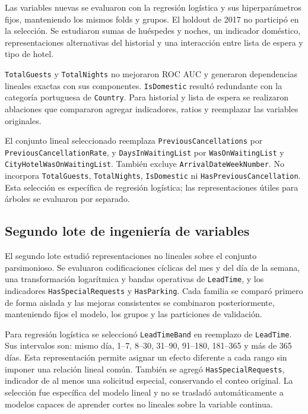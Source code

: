 Las variables nuevas se evaluaron con la regresión logística y sus
hiperparámetros fijos, manteniendo los mismos folds y grupos. El holdout de
2017 no participó en la selección. Se estudiaron sumas de huéspedes y noches,
un indicador doméstico, representaciones alternativas del historial y una
interacción entre lista de espera y tipo de hotel.

\texttt{TotalGuests} y \texttt{TotalNights} no mejoraron ROC AUC y generaron
dependencias lineales exactas con sus componentes. \texttt{IsDomestic} resultó
redundante con la categoría portuguesa de \texttt{Country}. Para historial y
lista de espera se realizaron ablaciones que compararon agregar indicadores,
ratios y reemplazar las variables originales.

El conjunto lineal seleccionado reemplaza \texttt{PreviousCancellations} por
\texttt{PreviousCancellationRate}, y \texttt{DaysInWaitingList} por
\texttt{WasOnWaitingList} y \texttt{CityHotelWasOnWaitingList}. También
excluye \texttt{ArrivalDateWeekNumber}. No incorpora \texttt{TotalGuests},
\texttt{TotalNights}, \texttt{IsDomestic} ni
\texttt{HasPreviousCancellation}. Esta selección es específica de regresión
logística; las representaciones útiles para árboles se evaluaron por separado.

\subsection{Segundo lote de ingeniería de variables}

El segundo lote estudió representaciones no lineales sobre el conjunto
parsimonioso. Se evaluaron codificaciones cíclicas del mes y del día de la
semana, una transformación logarítmica y bandas operativas de
\texttt{LeadTime}, y los indicadores \texttt{HasSpecialRequests} y
\texttt{HasParking}. Cada familia se comparó primero de forma aislada y las
mejoras consistentes se combinaron posteriormente, manteniendo fijos el
modelo, los grupos y las particiones de validación.

Para regresión logística se seleccionó \texttt{LeadTimeBand} en reemplazo de
\texttt{LeadTime}. Sus intervalos son: mismo día, 1--7, 8--30, 31--90,
91--180, 181--365 y más de 365 días. Esta representación permite asignar un
efecto diferente a cada rango sin imponer una relación lineal común. También
se agregó \texttt{HasSpecialRequests}, indicador de al menos una solicitud
especial, conservando el conteo original. La selección fue específica del
modelo lineal y no se trasladó automáticamente a modelos capaces de aprender
cortes no lineales sobre la variable continua.

